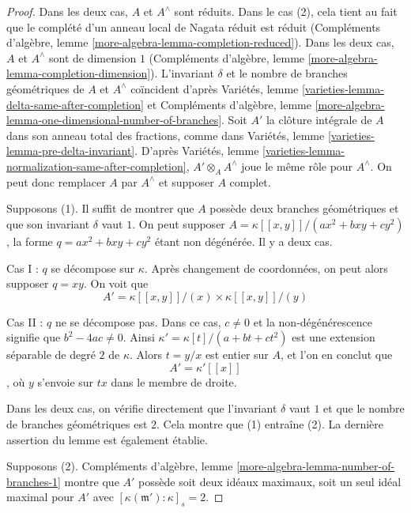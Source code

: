 \begin{proof}
Dans les deux cas, $A$ et $A^\wedge$ sont réduits. Dans le cas (2), cela tient au fait que le complété d'un anneau local de Nagata réduit est réduit (Compléments d'algèbre, lemme \ref{more-algebra-lemma-completion-reduced}). Dans les deux cas, $A$ et $A^\wedge$ sont de dimension $1$ (Compléments d'algèbre, lemme \ref{more-algebra-lemma-completion-dimension}). L'invariant $\delta$ et le nombre de branches géométriques de $A$ et $A^\wedge$ coïncident d'après Variétés, lemme \ref{varieties-lemma-delta-same-after-completion} et Compléments d'algèbre, lemme \ref{more-algebra-lemma-one-dimensional-number-of-branches}. Soit $A'$ la clôture intégrale de $A$ dans son anneau total des fractions, comme dans Variétés, lemme \ref{varieties-lemma-pre-delta-invariant}. D'après Variétés, lemme \ref{varieties-lemma-normalization-same-after-completion}, $A' \otimes_A A^\wedge$ joue le même rôle pour $A^\wedge$. On peut donc remplacer $A$ par $A^\wedge$ et supposer $A$ complet.

\medskip\noindent
Supposons (1). Il suffit de montrer que $A$ possède deux branches géométriques et que son invariant $\delta$ vaut $1$. On peut supposer $A = \kappa[[x, y]]/(ax^2 + bxy + cy^2)$, la forme $q = ax^2 + bxy + cy^2$ étant non dégénérée. Il y a deux cas.

\medskip\noindent
Cas I : $q$ se décompose sur $\kappa$. Après changement de coordonnées, on peut alors supposer $q = xy$. On voit que
$$
A' = \kappa[[x, y]]/(x) \times \kappa[[x, y]]/(y)
$$

\medskip\noindent
Cas II : $q$ ne se décompose pas. Dans ce cas, $c \not = 0$ et la non-dégénérescence signifie que $b^2 - 4ac \not = 0$. Ainsi $\kappa' = \kappa[t]/(a + bt + ct^2)$ est une extension séparable de degré $2$ de $\kappa$. Alors $t = y/x$ est entier sur $A$, et l'on en conclut que $$
A' = \kappa'[[x]]
$$, où $y$ s'envoie sur $tx$ dans le membre de droite.

\medskip\noindent
Dans les deux cas, on vérifie directement que l'invariant $\delta$ vaut $1$ et que le nombre de branches géométriques est $2$. Cela montre que (1) entraîne (2). La dernière assertion du lemme est également établie.

\medskip\noindent
Supposons (2). Compléments d'algèbre, lemme \ref{more-algebra-lemma-number-of-branches-1} montre que $A'$ possède soit deux idéaux maximaux, soit un seul idéal maximal pour $A'$ avec $[\kappa(\mathfrak m') : \kappa]_s = 2$.


\end{proof}
